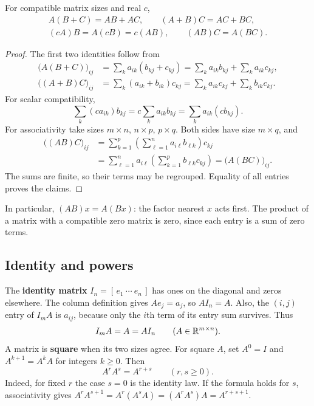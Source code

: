 \begin{proposition}\label{prop:01:product-laws}
For compatible matrix sizes and real \(c\),
\begin{gather*}
A(B+C)=AB+AC,\qquad (A+B)C=AC+BC,\\
(cA)B=A(cB)=c(AB),\qquad (AB)C=A(BC).
\end{gather*}
\end{proposition}
\begin{proof}
The first two identities follow from
\begin{align*}
\bigl(A(B+C)\bigr)_{ij}
 &=\sum_k a_{ik}(b_{kj}+c_{kj})
 =\sum_k a_{ik}b_{kj}+\sum_k a_{ik}c_{kj},\\
\bigl((A+B)C\bigr)_{ij}
 &=\sum_k(a_{ik}+b_{ik})c_{kj}
 =\sum_k a_{ik}c_{kj}+\sum_k b_{ik}c_{kj}.
\end{align*}
For scalar compatibility,
\[
\sum_k(ca_{ik})b_{kj}=c\sum_k a_{ik}b_{kj}
=\sum_k a_{ik}(cb_{kj}).
\]
For associativity take sizes \(m\times n\), \(n\times p\), \(p\times q\).
Both sides have size \(m\times q\), and
\begin{align*}
\bigl((AB)C\bigr)_{ij}
 &=\sum_{k=1}^p\left(\sum_{\ell=1}^n a_{i\ell}b_{\ell k}\right)c_{kj}\\
 &=\sum_{\ell=1}^n a_{i\ell}
       \left(\sum_{k=1}^p b_{\ell k}c_{kj}\right)
 =\bigl(A(BC)\bigr)_{ij}.
\end{align*}
The sums are finite, so their terms may be regrouped. Equality of all
entries proves the claims.
\end{proof}
In particular, \((AB)x=A(Bx)\): the factor nearest \(x\) acts first.
The product of a matrix with a compatible zero matrix is zero, since
each entry is a sum of zero terms.

\subsection*{Identity and powers}
The \textbf{identity matrix} \(I_n=[\,e_1\ \cdots\ e_n\,]\) has ones on
the diagonal and zeros elsewhere. The column definition gives
\(Ae_j=a_j\), so \(AI_n=A\). Also, the \((i,j)\) entry of \(I_mA\)
is \(a_{ij}\), because only the \(i\)th term of its entry sum survives.
Thus
\[
I_mA=A=AI_n\qquad(A\in\mathbb R^{m\times n}).
\]
A matrix is \textbf{square} when its two sizes agree. For square \(A\),
set \(A^0=I\) and \(A^{k+1}=A^kA\) for integers \(k\geqslant0\).
Then
\[
A^rA^s=A^{r+s}\qquad(r,s\geqslant0).
\]
Indeed, for fixed \(r\) the case \(s=0\) is the identity law. If the
formula holds for \(s\), associativity gives
\(A^rA^{s+1}=A^r(A^sA)=(A^rA^s)A=A^{r+s+1}\).

